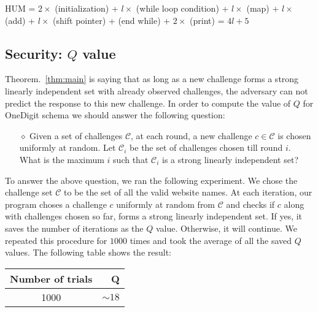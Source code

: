 \documentclass{article}
\begin{document}
HUM =  $2 \times$ (initialization) + $l \times$ (while loop condition) + $l \times$ (map) + $l \times$ (add) + $l \times$ (shift pointer) + (end while) + $2 \times$ (print) = $4l+5$


\subsection{Security: $Q$ value}

Theorem.~\ref{thm:main} is saying that as long as a new challenge forms a strong linearly independent set with already observed challenges, the adversary can not predict the response to this new challenge. In order to compute the value of $Q$ for OneDigit schema we should answer the following question:
\begin{itemize}
	\item[$\diamond$] Given a set of challenges $\mathcal{C}$, at each round, a new challenge $c \in \mathcal{C}$ is chosen uniformly at random. Let $\mathcal{C}_i$ be the set of challenges chosen till round $i$. What is the maximum $i$
	such that $\mathcal{C}_i$ is a strong linearly independent set?
	\end{itemize}
To answer the above question, we ran the following experiment. We chose the challenge set $\mathcal{C}$ to be the set of all the valid website names. At each iteration, our program choses a challenge $c$ uniformly at random from $\mathcal{C}$ and checks if $c$ along with challenges chosen so far, forms a strong linearly independent set. If yes, it saves the number of iterations as the $Q$ value. Otherwise, it will continue. We repeated this procedure for $1000$ times and took the average of all the saved $Q$ values. The following table shows the result:

\vspace{3mm}


\begin{center}
\begin{tabular}{c|r}
Number of trials              & Q  \\
\hline
1000              &   $\sim 18$             \\
\end{tabular}
\label{QValue}
\end{center}
\end{document}
